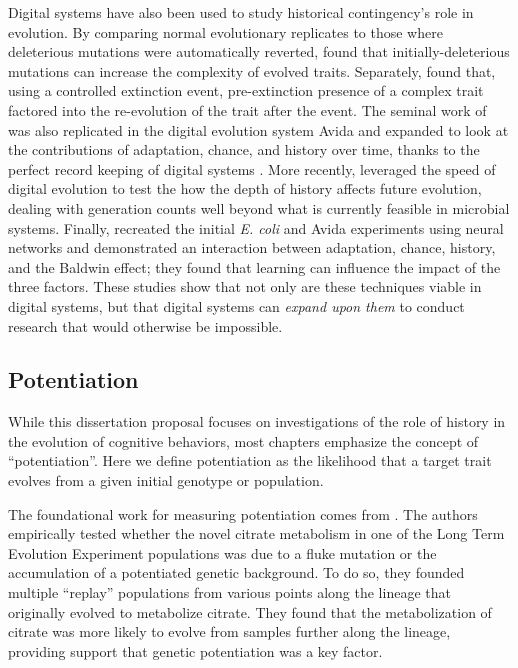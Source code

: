 Digital systems have also been used to study historical contingency's role in evolution. %
By comparing normal evolutionary replicates to those where deleterious mutations were automatically reverted, \citet{covertiiiExperimentsRoleDeleterious2013} found that initially-deleterious mutations can increase the complexity of evolved traits. 
Separately, \citet{yedidHistoricalContingentFactors2008} found that, using a controlled extinction event, pre-extinction presence of a complex trait factored into the re-evolution of the trait after the event. 
The seminal work of \citet{travisanoExperimentalTestsRoles1995} was also replicated in the digital evolution system Avida and expanded to look at the contributions of adaptation, chance, and history over time, thanks to the perfect record keeping of digital systems \citep{wagenaarInfluenceChanceHistory2004a}.
More recently, \citet{bundyHowFootprintHistory2021} leveraged the speed of digital evolution to test the how the depth of history affects future evolution, dealing with generation counts well beyond what is currently feasible in microbial systems. 
Finally, \citet{braughtEffectsLearningRoles2007} recreated the initial \textit{E. coli} and Avida experiments using neural networks and demonstrated an interaction between adaptation, chance, history, and the Baldwin effect; they found that learning can influence the impact of the three factors. 
These studies show that not only are these techniques viable in digital systems, but that digital systems can \textit{expand upon them} to conduct research that would otherwise be impossible.

\subsection{Potentiation}

While this dissertation proposal focuses on investigations of the role of history in the evolution of cognitive behaviors, most chapters emphasize the concept of ``potentiation''. 
Here we define potentiation as the likelihood that a target trait evolves from a given initial genotype or population.

The foundational work for measuring potentiation comes from \citet{blountHistoricalContingencyEvolution2008}. 
The authors empirically tested whether the novel citrate metabolism in one of the Long Term Evolution Experiment populations \citep{lenskiLongtermExperimentalEvolution1991} was due to a fluke mutation or the accumulation of a potentiated genetic background. 
To do so, they founded multiple ``replay'' populations from various points along the lineage that originally evolved to metabolize citrate. 
They found that the metabolization of citrate was more likely to evolve from samples further along the lineage, providing support that genetic potentiation was a key factor. 

